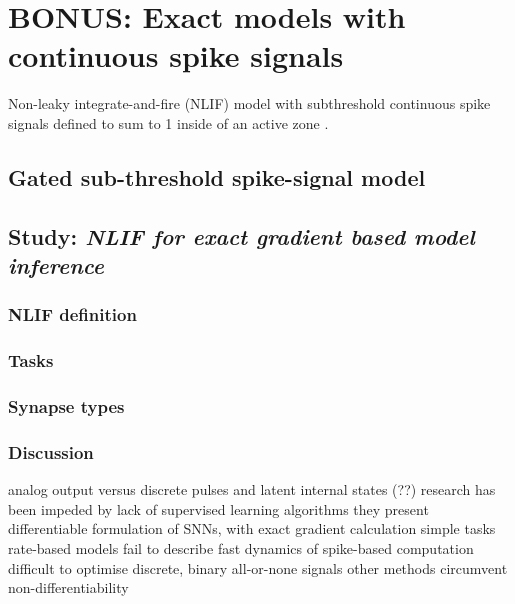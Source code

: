 \documentclass[mphil,deptreport,ianc]{infthesis} %
\begin{document}
\chapter{BONUS: Exact models with continuous spike signals}

Non-leaky integrate-and-fire (NLIF) model with subthreshold continuous spike signals defined to sum to 1 inside of an active zone \cite{Huh2017}.

\section{Gated sub-threshold spike-signal model}

\section{Study: \textit{NLIF for exact gradient based model inference}}

\subsection{NLIF definition}

\subsection{Tasks}

\subsection{Synapse types}

\subsection{Discussion}

analog output versus discrete pulses and latent internal states (??)
research has been impeded by lack of supervised learning algorithms
they present differentiable formulation of SNNs, with exact gradient calculation
simple tasks
rate-based models fail to describe fast dynamics of spike-based computation
difficult to optimise discrete, binary all-or-none signals
other methods circumvent non-differentiability
\end{document}
